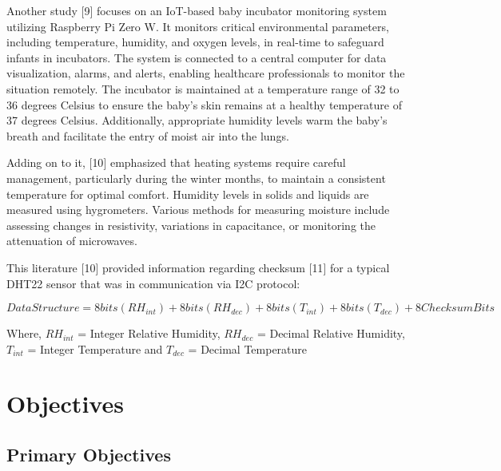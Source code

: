 \documentclass{article}
\begin{document}
Another study {[}9{]} focuses on an IoT-based baby incubator monitoring
system utilizing Raspberry Pi Zero W. It monitors critical environmental
parameters, including temperature, humidity, and oxygen levels, in
real-time to safeguard infants in incubators. The system is connected to
a central computer for data visualization, alarms, and alerts, enabling
healthcare professionals to monitor the situation remotely. The
incubator is maintained at a temperature range of 32 to 36 degrees
Celsius to ensure the baby's skin remains at a healthy temperature of 37
degrees Celsius. Additionally, appropriate humidity levels warm the
baby's breath and facilitate the entry of moist air into the lungs.

Adding on to it, {[}10{]} emphasized that heating systems require
careful management, particularly during the winter months, to maintain a
consistent temperature for optimal comfort. Humidity levels in solids
and liquids are measured using hygrometers. Various methods for
measuring moisture include assessing changes in resistivity, variations
in capacitance, or monitoring the attenuation of microwaves.

This literature {[}10{]} provided information regarding checksum
{[}11{]} for a typical DHT22 sensor that was in communication via I2C
protocol:

\[ 
Data Structure = 8 bits (RH_{int}) + 8 bits (RH_{dec}) + 8 bits (T_{int}) + 8 bits (T_{dec}) + 8 Checksum Bits 
\]

Where, \(RH_{int}\) = Integer Relative Humidity, \(RH_{dec}\) = Decimal
Relative Humidity, \(T_{int}\) = Integer Temperature and \(T_{dec}\) =
Decimal Temperature

\section{Objectives}\label{objectives}

\subsection{Primary Objectives}\label{primary-objectives}
\end{document}
